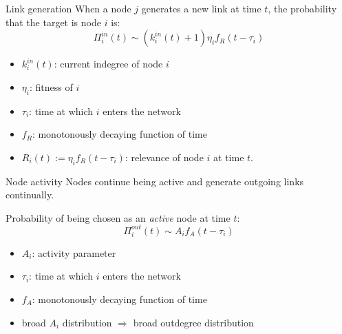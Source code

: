 \documentclass[utf8, compress]{beamer}
\begin{document}
\begin{frame}{Link generation}
    When a node $j$ generates a new link at time $t$, the probability that the target is node $i$ is:
    \[
        \Pi_i^{in}(t) \sim (k_i^{in}(t) + 1)\eta_i f_R (t-\tau_i)
    \]
    \begin{itemize}
        \item $k_i^{in}(t)$: current indegree of node $i$
        \item $\eta_i$: fitness of $i$
        \item $\tau_i$: time at which $i$ enters the network
        \item $f_R$: monotonously decaying function of time
        \item $R_i(t) := \eta_i f_R (t-\tau_i)$: \alert{relevance} of node $i$ at time $t$.
    \end{itemize}
\end{frame}

\begin{frame}{Node activity}
    Nodes continue being active and generate outgoing links continually.

    Probability of being chosen as an \emph{active} node at time $t$:
    \[
        \Pi_i^{out}(t) \sim A_i f_A (t-\tau_i)
    \]
    \begin{itemize}
        \item $A_i$: activity parameter
        \item $\tau_i$: time at which $i$ enters the network
        \item $f_A$: monotonously decaying function of time
        \item broad $A_i$ distribution $\Longrightarrow$ broad outdegree distribution
    \end{itemize}
\end{frame}
\end{document}
